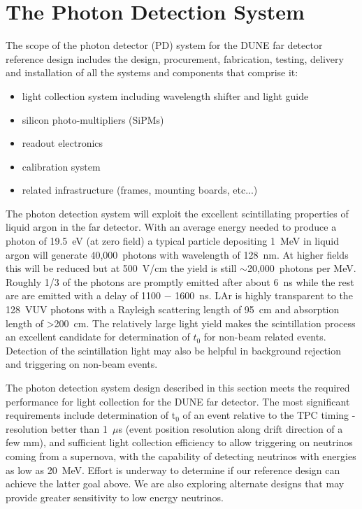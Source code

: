 \section{The Photon Detection System}
\label{sec:detectors-fd-ref-pd}

The scope of the photon detector (PD) system for the DUNE far detector reference design includes the design,
procurement, fabrication, testing, delivery and installation of all
the systems and components that comprise it:  

\begin{itemize}
\item light collection system including wavelength shifter and light guide
\item silicon photo-multipliers (SiPMs)
\item readout electronics
\item calibration system
\item related infrastructure (frames, mounting boards, etc...)
\end{itemize}

The photon detection system will exploit the excellent scintillating properties
of liquid argon in the far detector. 
With an average
energy needed to produce a photon of 19.5~eV (at zero field) a typical
particle depositing 1~MeV in liquid argon will generate 40,000~photons
with wavelength of 128~nm. At higher fields this will be reduced but
at 500~V/cm the yield is still $\sim$20,000~photons per
MeV. Roughly 1/3 of the photons are promptly emitted after about 6~ns
while the rest are are emitted with a delay of 1100 $-$ 1600~ns. LAr
is highly transparent to the 128~VUV photons with a Rayleigh
scattering length of 95~cm and absorption length of >200~cm.
 The relatively large light yield makes the scintillation
process an excellent candidate for determination of $t_{0}$ for
non-beam related events. Detection of the scintillation light may also
be helpful in background rejection and triggering on non-beam events.  

The photon detection system design described in this section meets the
required performance for light collection for the DUNE far
detector. The most significant requirements include determination of
t$_0$ of an event relative to the TPC timing - resolution better than
1~$\mu$s (event position resolution along drift direction of a few
mm), and sufficient light collection efficiency to allow triggering on
neutrinos coming from a supernova, with the capability of detecting
neutrinos with energies as low as 20~MeV. Effort is underway to
determine if our reference design can achieve the latter goal
above. We are also exploring alternate designs that may provide
greater sensitivity to low energy neutrinos.

